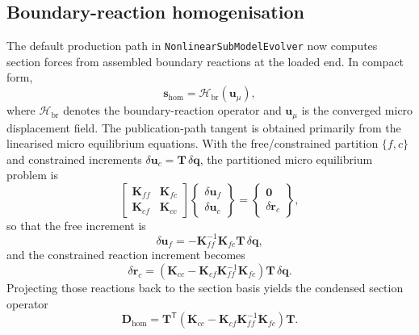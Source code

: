 \subsection{Boundary-reaction homogenisation}

The default production path in \texttt{NonlinearSubModelEvolver} now computes
section forces from assembled boundary reactions at the loaded end.  In compact
form,
\begin{equation}
  \mathbf{s}_{\mathrm{hom}}
  =
  \mathcal{H}_{\mathrm{br}}(\mathbf{u}_{\mu}),
\end{equation}
where \(\mathcal{H}_{\mathrm{br}}\) denotes the boundary-reaction operator and
\(\mathbf{u}_{\mu}\) is the converged micro displacement field.  The
publication-path tangent is obtained primarily from the linearised micro
equilibrium equations.  With the free/constrained partition
\(\{f,c\}\) and constrained increments
\(\delta \mathbf{u}_c = \mathbf{T}\,\delta \mathbf{q}\), the partitioned micro
equilibrium problem is
\begin{equation}
  \begin{bmatrix}
    \mathbf{K}_{ff} & \mathbf{K}_{fc} \\
    \mathbf{K}_{cf} & \mathbf{K}_{cc}
  \end{bmatrix}
  \begin{Bmatrix}
    \delta \mathbf{u}_f \\
    \delta \mathbf{u}_c
  \end{Bmatrix}
  =
  \begin{Bmatrix}
    \mathbf{0} \\
    \delta \mathbf{r}_c
  \end{Bmatrix},
  \label{eq:ms-pub-partitioned-micro-equilibrium}
\end{equation}
so that the free increment is
\begin{equation}
  \delta \mathbf{u}_f
  =
  -\mathbf{K}_{ff}^{-1}\mathbf{K}_{fc}\mathbf{T}\,\delta \mathbf{q},
  \label{eq:ms-pub-free-increment}
\end{equation}
and the constrained reaction increment becomes
\begin{equation}
  \delta \mathbf{r}_c
  =
  \left(
    \mathbf{K}_{cc}
    -
    \mathbf{K}_{cf}\mathbf{K}_{ff}^{-1}\mathbf{K}_{fc}
  \right)\mathbf{T}\,\delta \mathbf{q}.
  \label{eq:ms-pub-constrained-reaction}
\end{equation}
Projecting those reactions back to the section basis yields the condensed
section operator
\begin{equation}
  \mathbf{D}_{\mathrm{hom}}
  =
  \mathbf{T}^{\mathsf T}
  \left(
    \mathbf{K}_{cc}
    -
    \mathbf{K}_{cf}\mathbf{K}_{ff}^{-1}\mathbf{K}_{fc}
  \right)\mathbf{T}.
  \label{eq:ms-pub-condensed-section-operator}
\end{equation}
